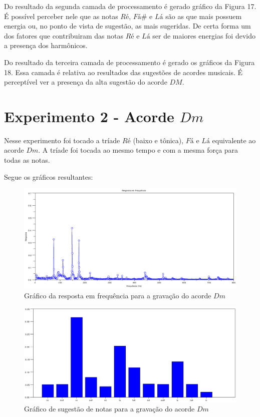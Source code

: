 Do resultado da segunda camada de processamento é gerado gráfico da Figura 17. É possível perceber nele que as notas $Ré$, $Fá\#$ e $Lá$ são as que mais possuem energia ou, no ponto de vista de sugestão, as mais sugeridas. De certa forma um dos fatores que contribuiram das notas $Ré$ e $Lá$ ser de maiores energias foi devido a presença dos harmônicos.

Do resultado da terceira camada de processamento é gerado os gráficos da Figura 18. Essa camada é relativa ao resultados das sugestões de acordes musicais. É perceptível ver a presença da alta sugestão do acorde $DM$.
\section{Experimento 2 - Acorde $Dm$}
\label{sec:experimento2}

Nesse experimento foi tocado a tríade $Ré$ (baixo e tônica), $Fá$ e $Lá$ equivalente ao acorde $Dm$. A tríade foi tocada ao mesmo tempo e com a mesma força para todas as notas.

Segue os gráficos resultantes:

\begin{figure}[h]
	\centering
		\includegraphics[keepaspectratio=true,scale=0.49]{figuras/Dm/fft_Dm.eps}
	\caption{Gráfico da resposta em frequência para a gravação do acorde $Dm$}
\end{figure}

\begin{figure}[h]
	\centering
		\includegraphics[keepaspectratio=true,scale=0.49]{figuras/Dm/notas_Dm.eps}
	\caption{Gráfico de sugestão de notas para a gravação do acorde $Dm$}
\end{figure}


